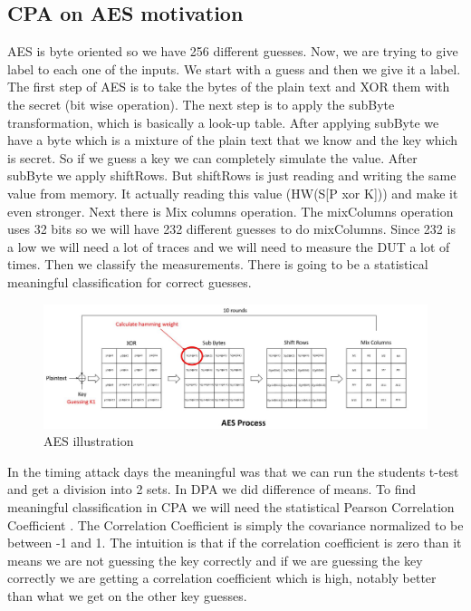 \subsection{CPA on AES motivation}
AES is byte oriented so we have 256 different guesses. Now, we are trying to give label to each one of the inputs. We start with a guess and then we give it a label. The first step of AES is to take the bytes of the plain text and XOR them with the secret (bit wise operation). The next step is to apply the subByte transformation, which is basically a look-up table. After applying subByte we have a byte which is a mixture of the plain text that we know and the key which is secret. So if we guess a key we can completely simulate the value. After subByte we apply shiftRows. But shiftRows is just reading and writing the same value from memory. It actually reading this value (HW(S[P xor K])) and make it even stronger. Next there is Mix columns operation. The mixColumns operation uses 32 bits so we will have 232 different guesses to do mixColumns. Since 232 is a low we will need a lot of traces and we will need to measure the DUT a lot of times. Then we classify the measurements. There is going to be a statistical meaningful classification for correct guesses.
\begin{figure}[H]
    \centering
    \includegraphics[width=1.0\textwidth]{images/chapter8/aes_process.jpg}
    \caption{AES illustration} \label{c8_aes:fig}
\end{figure}
In the timing attack days the meaningful was that we can run the students t-test and get a division into 2 sets. In DPA we did  difference of means. To find meaningful classification in CPA we will need the statistical Pearson Correlation Coefficient \cite{PearsonCorrelationCoefficient}. The Correlation Coefficient is simply the covariance normalized to be between -1 and 1. The intuition is that if the correlation coefficient is zero than it means we are not guessing the key correctly and if we are guessing the key correctly we are getting a correlation coefficient which is high, notably better than what we get on the other key guesses. 

